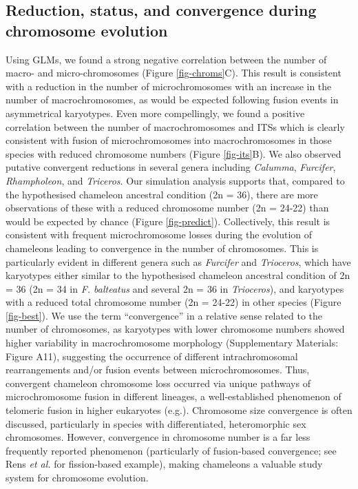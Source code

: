 \documentclass[a4paper, 12pt]{article}
\begin{document}
\subsection{Reduction, status, and convergence during chromosome evolution}
Using GLMs, we found a strong negative correlation between the number of macro- and micro-chromosomes (Figure \ref{fig-chroms}C). 
This result is consistent with a reduction in the number of microchromosomes with an increase in the number of macrochromosomes, as would be expected following fusion events in asymmetrical karyotypes. 
Even more compellingly, we found a positive correlation between the number of macrochromosomes and ITSs which is clearly consistent with fusion of microchromosomes into macrochromosomes in those species with reduced chromosome numbers (Figure \ref{fig-its}B). 
We also observed putative convergent reductions in several genera including \textit{Calumma}, \textit{Furcifer}, \textit{Rhampholeon}, and \textit{Triceros}. 
Our simulation analysis supports that, compared to the hypothesised chameleon ancestral condition (2n = 36), there are more observations of these with a reduced chromosome number (2n = 24-22) than would be expected by chance (Figure \ref{fig-predict}). 
Collectively, this result is consistent with frequent microchromosome losses during the evolution of chameleons leading to convergence in the number of chromosomes. 
This is particularly evident in different genera such as \textit{Furcifer} and \textit{Trioceros}, which have karyotypes either similar to the hypothesised chameleon ancestral condition of 2n = 36 (2n = 34 in \textit{F. balteatus} and several 2n = 36 in \textit{Trioceros}), and karyotypes with a reduced total chromosome number (2n = 24-22) in other species (Figure \ref{fig-best}). 
We use the term ``convergence'' in a relative sense related to the number of chromosomes, as karyotypes with lower chromosome numbers showed higher variability in macrochromosome morphology (Supplementary Materials: Figure A11), suggesting the occurrence of different intrachromosomal rearrangements and/or fusion events between microchromosomes. 
Thus, convergent chameleon chromosome loss occurred via unique pathways of microchromosome fusion in different lineages, a well-established phenomenon of telomeric fusion in higher eukaryotes (e.g.\cite{heacock2004molecular}).  
Chromosome size convergence is often discussed, particularly in species with differentiated, heteromorphic sex chromosomes\cite{montiel2017discovery,kratochvil2021sex}. 
However, convergence in chromosome number is a far less frequently reported phenomenon (particularly of fusion-based convergence; see Rens \textit{et al.}\cite{rens2003reversal} for fission-based example), making chameleons a valuable study system for chromosome evolution. 
\end{document}
